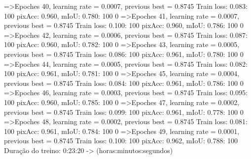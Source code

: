=>Epoches 40, learning rate = 0.0007,                 previous best = 0.8745
Train loss: 0.083: 100%
pixAcc: 0.960, mIoU: 0.780: 100%
  0%
=>Epoches 41, learning rate = 0.0007,                 previous best = 0.8745
Train loss: 0.100: 100%
pixAcc: 0.960, mIoU: 0.786: 100%
  0%
=>Epoches 42, learning rate = 0.0006,                 previous best = 0.8745
Train loss: 0.087: 100%
pixAcc: 0.960, mIoU: 0.782: 100%
  0%
=>Epoches 43, learning rate = 0.0005,                 previous best = 0.8745
Train loss: 0.086: 100%
pixAcc: 0.961, mIoU: 0.780: 100%
  0%
=>Epoches 44, learning rate = 0.0005,                 previous best = 0.8745
Train loss: 0.082: 100%
pixAcc: 0.961, mIoU: 0.781: 100%
  0%
=>Epoches 45, learning rate = 0.0004,                 previous best = 0.8745
Train loss: 0.084: 100%
pixAcc: 0.961, mIoU: 0.786: 100%
  0%
=>Epoches 46, learning rate = 0.0003,                 previous best = 0.8745
Train loss: 0.095: 100%
pixAcc: 0.960, mIoU: 0.785: 100%
  0%
=>Epoches 47, learning rate = 0.0002,                 previous best = 0.8745
Train loss: 0.099: 100%
pixAcc: 0.961, mIoU: 0.778: 100%
  0%
=>Epoches 48, learning rate = 0.0002,                 previous best = 0.8745
Train loss: 0.081: 100%
pixAcc: 0.961, mIoU: 0.784: 100%
  0%
=>Epoches 49, learning rate = 0.0001,                 previous best = 0.8745
Train loss: 0.100: 100%
pixAcc: 0.962, mIoU: 0.788: 100%
Duração do treino: 0:23:20 -> (horas:minutos:segundos)

